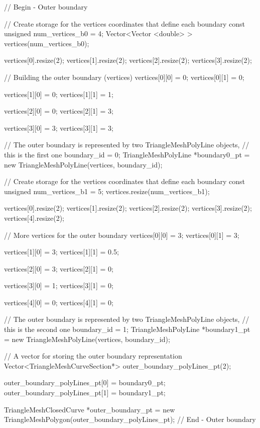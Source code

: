  
\begin{DoxyCodeInclude}
  \textcolor{comment}{// Begin - Outer boundary}

  \textcolor{comment}{// Create storage for the vertices coordinates that define each boundary}
  \textcolor{keyword}{const} \textcolor{keywordtype}{unsigned} num\_vertices\_b0 = 4;
  Vector<Vector <double> > vertices(num\_vertices\_b0);

  vertices[0].resize(2);
  vertices[1].resize(2);
  vertices[2].resize(2);
  vertices[3].resize(2);

  \textcolor{comment}{// Building the outer boundary (vertices)}
  vertices[0][0] = 0;
  vertices[0][1] = 0;

  vertices[1][0] = 0;
  vertices[1][1] = 1;

  vertices[2][0] = 0;
  vertices[2][1] = 3;

  vertices[3][0] = 3;
  vertices[3][1] = 3;

  \textcolor{comment}{// The outer boundary is represented by two TriangleMeshPolyLine objects,}
  \textcolor{comment}{// this is the first one}
  boundary\_id = 0;
  TriangleMeshPolyLine *boundary0\_pt =
      \textcolor{keyword}{new} TriangleMeshPolyLine(vertices, boundary\_id);

  \textcolor{comment}{// Create storage for the vertices coordinates that define each boundary}
  \textcolor{keyword}{const} \textcolor{keywordtype}{unsigned} num\_vertices\_b1 = 5;
  vertices.resize(num\_vertices\_b1);

  vertices[0].resize(2);
  vertices[1].resize(2);
  vertices[2].resize(2);
  vertices[3].resize(2);
  vertices[4].resize(2);

  \textcolor{comment}{// More vertices for the outer boundary}
  vertices[0][0] = 3;
  vertices[0][1] = 3;

  vertices[1][0] = 3;
  vertices[1][1] = 0.5;

  vertices[2][0] = 3;
  vertices[2][1] = 0;

  vertices[3][0] = 1;
  vertices[3][1] = 0;

  vertices[4][0] = 0;
  vertices[4][1] = 0;

  \textcolor{comment}{// The outer boundary is represented by two TriangleMeshPolyLine objects,}
  \textcolor{comment}{// this is the second one}
  boundary\_id = 1;
  TriangleMeshPolyLine *boundary1\_pt =
      \textcolor{keyword}{new} TriangleMeshPolyLine(vertices, boundary\_id);

  \textcolor{comment}{// A vector for storing the outer boundary representation}
  Vector<TriangleMeshCurveSection*> outer\_boundary\_polyLines\_pt(2);

  outer\_boundary\_polyLines\_pt[0] = boundary0\_pt;
  outer\_boundary\_polyLines\_pt[1] = boundary1\_pt;

  TriangleMeshClosedCurve *outer\_boundary\_pt =
      \textcolor{keyword}{new} TriangleMeshPolygon(outer\_boundary\_polyLines\_pt);
  \textcolor{comment}{// End - Outer boundary}

\end{DoxyCodeInclude}


